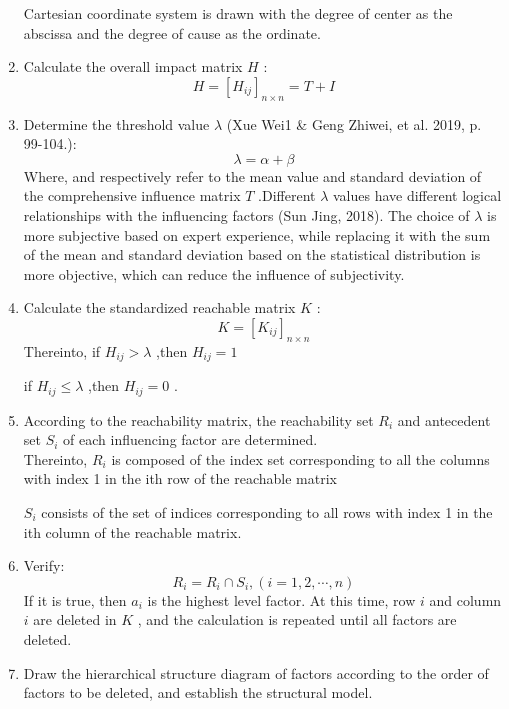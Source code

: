 \documentclass[12pt]{article}  %
\begin{document}
\begin{enumerate}
Cartesian coordinate system is drawn with the degree of center as the abscissa and the degree of 
cause as the ordinate.
    \item  Calculate the overall impact matrix $H$ :
    \begin{equation}
        H=[H_{ij}]_{n\times n}=T+I
    \end{equation}
    \item Determine the threshold value $\lambda$ (Xue Wei1 \& Geng Zhiwei, et al. 2019, p. 99-104.):
\begin{equation}
    \lambda =\alpha +\beta
\end{equation}
Where, and respectively refer to the mean value and standard deviation of the comprehensive 
influence matrix $T$ .Different $\lambda$ values have different logical relationships with the 
influencing factors (Sun Jing, 2018). The choice of $\lambda$ is more subjective based on expert 
experience, while replacing it with the sum of the mean and standard deviation based on the 
statistical distribution is more objective, which can reduce the influence of subjectivity.
    \item Calculate the standardized reachable matrix $K$ :
\begin{equation}
    K=[K_{ij}]_{n\times n}
\end{equation}
Thereinto, if $H_{ij}>\lambda$ ,then $H_{ij}=1$ 

\hspace{4.35em}if $H_{ij}\le \lambda$ ,then $H_{ij}=0$ .
\item  According to the reachability matrix, the reachability set $R_i$ and antecedent set $S_i$ of each 
influencing factor are determined.\\ 
Thereinto, $R_i$ is composed of the index set corresponding to all the 
columns with index 1 in the ith row of the reachable matrix

\hspace{4.25em} $S_i$ consists of the set of indices 
corresponding to all rows with index 1 in the ith column of the reachable matrix.
\item Verify:
\begin{equation}
    R_i=R_i\cap S_i,(i=1,2,\cdots ,n)
\end{equation}
If it is true, then $a_i$ is the highest level factor. At this time, row $i$ and column $i$ are deleted in $K$ , 
and the calculation is repeated until all factors are deleted.
\item Draw the hierarchical structure diagram of factors according to the order of factors to be 
deleted, and establish the structural model.
\end{enumerate}
\end{document}
